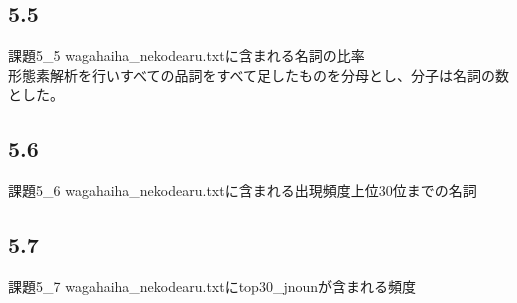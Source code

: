 \documentclass[a4j,titlepage]{jarticle}
\begin{document}
\subsection*{5.5}
  課題5\_5 wagahaiha\_nekodearu.txtに含まれる名詞の比率\\
  形態素解析を行いすべての品詞をすべて足したものを分母とし、分子は名詞の数とした。\\
  \fontsize{10pt}{10pt}
\subsection*{5.6}
  課題5\_6 wagahaiha\_nekodearu.txtに含まれる出現頻度上位30位までの名詞\\
  \fontsize{10pt}{10pt}
\subsection*{5.7}
  課題5\_7 wagahaiha\_nekodearu.txtにtop30\_jnounが含まれる頻度\\
  \fontsize{10pt}{10pt}
\end{document}
